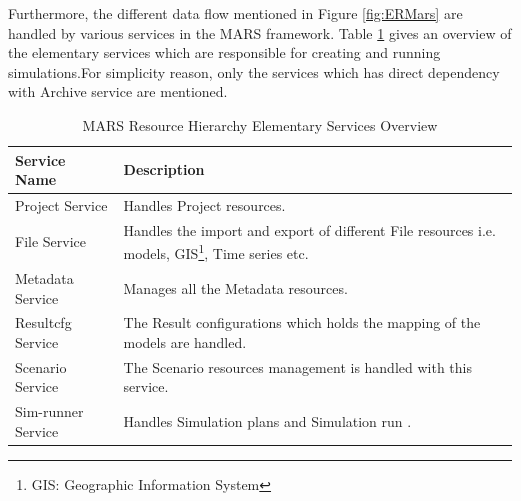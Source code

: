         Furthermore, the different data flow mentioned in Figure \ref{fig:ERMars} are handled by various services in the MARS framework. 
        Table \ref{table:MARS Resource Hierarchy Service Overview} gives an overview of the elementary services which are responsible for 
        creating and running simulations.For simplicity reason, only the services
        which has direct dependency with Archive service are mentioned.
        \begin{table}[h!]
            \centering
            \begin{tabular}{|p{4cm}|p{11cm}|}
                \hline
                    \textbf{Service Name}  & \textbf{Description}\\
                \hline
                    Project Service & 
                    Handles Project resources. \\
                \hline
                    File Service
                    & Handles the import and export of different File resources i.e. models, GIS\footnote{\label{footnote:GIS}GIS: Geographic Information System}, 
                    Time series etc.\\
                \hline
                    Metadata Service  & Manages all the Metadata resources.\\
                \hline
                    Resultcfg Service  & The Result configurations which holds the mapping of the models are handled.\\
                \hline
                    Scenario Service  & The Scenario resources management is handled with this service.\\
                \hline
                    Sim-runner Service  & Handles Simulation plans and Simulation run .\\
                \hline
            \end{tabular}
            \caption{MARS Resource Hierarchy Elementary Services Overview}
            \label{table:MARS Resource Hierarchy Service Overview}     
        \end{table}    